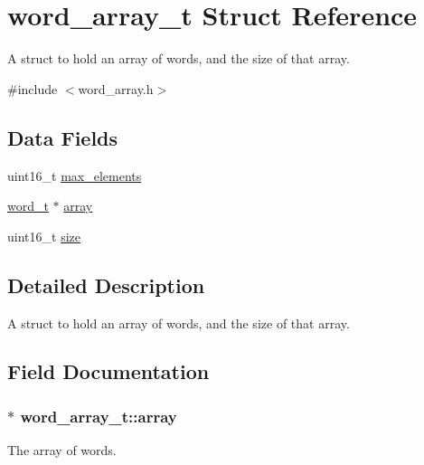 \hypertarget{structword__array__t}{}\section{word\+\_\+array\+\_\+t Struct Reference}
\label{structword__array__t}


A struct to hold an array of words, and the size of that array.  




{\ttfamily \#include $<$word\+\_\+array.\+h$>$}

\subsection*{Data Fields}
\begin{DoxyCompactItemize}
\item 
uint16\+\_\+t \hyperlink{structword__array__t_a6ee8bec82913800ec8b2b8d3e71d9c46}{max\+\_\+elements}
\item 
\hyperlink{global_8h_a0e7744482eed560726581dae7d3cb8b2}{word\+\_\+t} $\ast$ \hyperlink{structword__array__t_a07752c88400708c71e22ea6b72bc9365}{array}
\item 
uint16\+\_\+t \hyperlink{structword__array__t_a86cd7d60401db1c1aac7691a811c60e9}{size}
\end{DoxyCompactItemize}


\subsection{Detailed Description}
A struct to hold an array of words, and the size of that array. 

\subsection{Field Documentation}
\subsubsection[{\texorpdfstring{array}{array}}]{$\ast$ word\+\_\+array\+\_\+t\+::array}\hypertarget{structword__array__t_a07752c88400708c71e22ea6b72bc9365}{}\label{structword__array__t_a07752c88400708c71e22ea6b72bc9365}
The array of words. 
